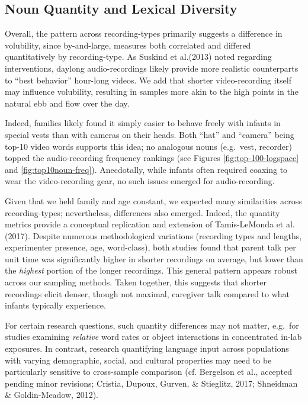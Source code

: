 \documentclass[man]{apa6}
\theoremstyle{definition}
\theoremstyle{definition}
\theoremstyle{definition}
\theoremstyle{remark}
\begin{document}
\subsection{Noun Quantity and Lexical
Diversity}\label{noun-quantity-and-lexical-diversity}

Overall, the pattern across recording-types primarily suggests a
difference in volubility, since by-and-large, measures both correlated
and differed quantitatively by recording-type. As Suskind et al.(2013)
noted regarding interventions, daylong audio-recordings likely provide
more realistic counterparts to \enquote{best behavior} hour-long videos.
We add that shorter video-recording itself may influence volubility,
resulting in samples more akin to the high points in the natural ebb and
flow over the day.

Indeed, families likely found it simply easier to behave freely with
infants in special vests than with cameras on their heads. Both
\enquote{hat} and \enquote{camera} being top-10 video words supports
this idea; no analogous nouns (e.g.~vest, recorder) topped the
audio-recording frequency rankings (see Figures
\ref{fig:top-100-logspace} and \ref{fig:top10noun-freq}). Anecdotally,
while infants often required coaxing to wear the video-recording gear,
no such issues emerged for audio-recording.

Given that we held family and age constant, we expected many
similarities across recording-types; nevertheless, differences also
emerged. Indeed, the quantity metrics provide a conceptual replication
and extension of Tamis-LeMonda et al. (2017). Despite numerous
methodological variations (recording types and lengths, experimenter
presence, age, word-class), both studies found that parent talk per unit
time was significantly higher in shorter recordings on average, but
lower than the \emph{highest} portion of the longer recordings. This
general pattern appears robust across our sampling methods. Taken
together, this suggests that shorter recordings elicit denser, though
not maximal, caregiver talk compared to what infants typically
experience.

For certain research questions, such quantity differences may not
matter, e.g.~for studies examining \emph{relative} word rates or object
interactions in concentrated in-lab exposures. In contrast, research
quantifying language input across populations with varying demographic,
social, and cultural properties may need to be particularly sensitive to
cross-sample comparison (cf. Bergelson et al., accepted pending minor
revisions; Cristia, Dupoux, Gurven, \& Stieglitz, 2017; Shneidman \&
Goldin-Meadow, 2012).
\end{document}

